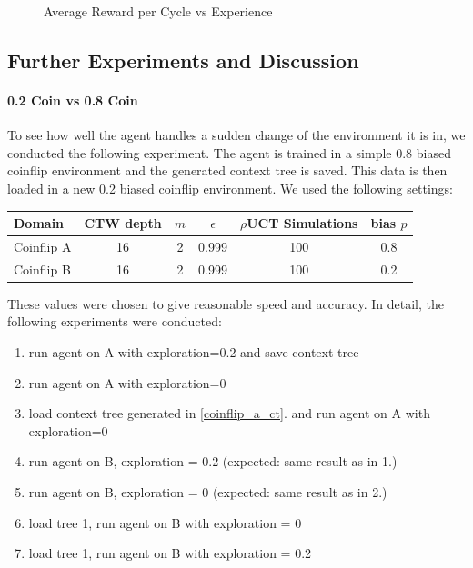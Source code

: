 \documentclass[paper=a4, fontsize=11pt]{scrartcl} %
\numberwithin{equation}{section} %
\numberwithin{figure}{section} %
\numberwithin{table}{section} %
\begin{document}
\begin{figure}
\caption{\label{plot:rewards}Average Reward per Cycle vs Experience}
\end{figure}

\setlength\parindent{0pt}

\subsection{Further Experiments and Discussion}

\paragraph{0.2 Coin vs 0.8 Coin} To see how well the agent handles a sudden change of the environment it is in, we conducted the following experiment. The agent is trained in a simple 0.8 biased coinflip environment and the generated context tree is saved. This data is then loaded in a new 0.2 biased coinflip environment. We used the following settings:

\bigskip

\begin{tabular}{|l|c|c|c|c|c|}
\hline
Domain & CTW depth & $m$ & $\epsilon$ & $\rho$UCT Simulations & bias $p$\\\hline
Coinflip A & 16 & 2 & 0.999 & 100 & 0.8\\
Coinflip B & 16 & 2 & 0.999 & 100 & 0.2\\\hline
\end{tabular}

\bigskip

These values were chosen to give reasonable speed and accuracy. In detail, the following experiments were conducted:

\begin{enumerate}
 \setlength{\itemsep}{0cm}%
  \setlength{\parskip}{0cm}%
\item run agent on A with exploration=0.2 and save context tree\label{coinflip_a_ct}
\item run agent on A with exploration=0
\item load context tree generated in \ref{coinflip_a_ct}. and run agent on A with exploration=0
\item run agent on B, exploration = 0.2 (expected: same result as in 1.)
\item run agent on B, exploration = 0 (expected: same result as in 2.)
\item load tree 1, run agent on B with exploration = 0
\item load tree 1, run agent on B with exploration = 0.2
\end{enumerate}
\end{document}
